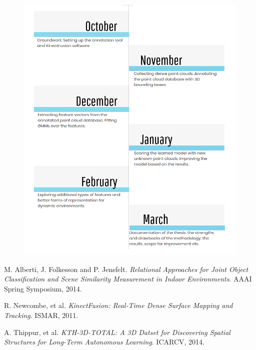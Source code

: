 \documentclass[12pt]{article}
\begin{document}
\begin{figure} [H]
\includegraphics[scale = 0.60]{timeline3.png}
\centering

\end{figure}

%
%


\newpage

\begin{thebibliography}{9}

M. Alberti, J. Folkesson and P. Jensfelt. 
\textit{Relational Approaches for Joint Object Classification and Scene Similarity Measurement in Indoor Environments}. 
AAAI Spring Symposium, 2014.
 
R. Newcombe, et al. 
\textit{KinectFusion: Real-Time Dense Surface Mapping and Tracking}. 
ISMAR, 2011.

A. Thippur, et al. 
\textit{KTH-3D-TOTAL: A 3D Datset for Discovering Spatial Structures for Long-Term Autonomous Learning}. 
ICARCV, 2014.
 
\end{thebibliography}
\end{document}
